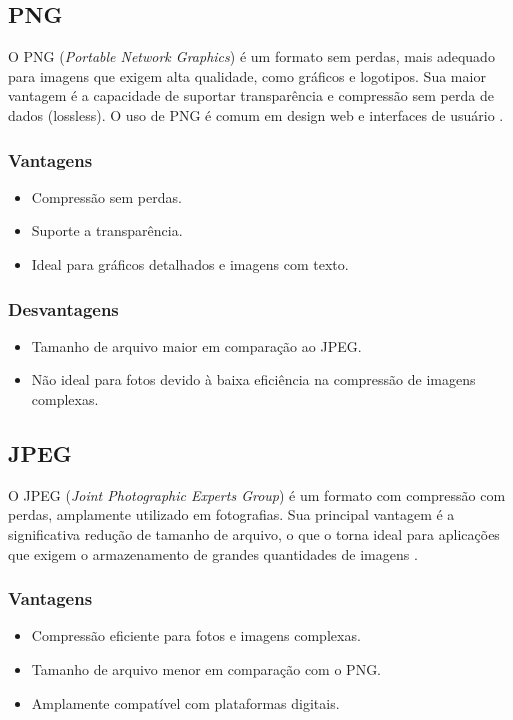 \documentclass[12pt]{report}
\begin{document}
	
	\subsection{PNG}
	O PNG (\textit{Portable Network Graphics}) é um formato sem perdas, mais adequado para imagens que exigem alta qualidade, como gráficos e logotipos. Sua maior vantagem é a capacidade de suportar transparência e compressão sem perda de dados (lossless). O uso de PNG é comum em design web e interfaces de usuário \cite{webnial2023}.
	
	\subsubsection{Vantagens}
	\begin{itemize}
		\item Compressão sem perdas.
		\item Suporte a transparência.
		\item Ideal para gráficos detalhados e imagens com texto.
	\end{itemize}
	
	\subsubsection{Desvantagens}
	\begin{itemize}
		\item Tamanho de arquivo maior em comparação ao JPEG.
		\item Não ideal para fotos devido à baixa eficiência na compressão de imagens complexas.
	\end{itemize}
	
	\subsection{JPEG}
	O JPEG (\textit{Joint Photographic Experts Group}) é um formato com compressão com perdas, amplamente utilizado em fotografias. Sua principal vantagem é a significativa redução de tamanho de arquivo, o que o torna ideal para aplicações que exigem o armazenamento de grandes quantidades de imagens \cite{techtudo2023}.
	
	\subsubsection{Vantagens}
	\begin{itemize}
		\item Compressão eficiente para fotos e imagens complexas.
		\item Tamanho de arquivo menor em comparação com o PNG.
		\item Amplamente compatível com plataformas digitais.
	\end{itemize}
	
\end{document}
